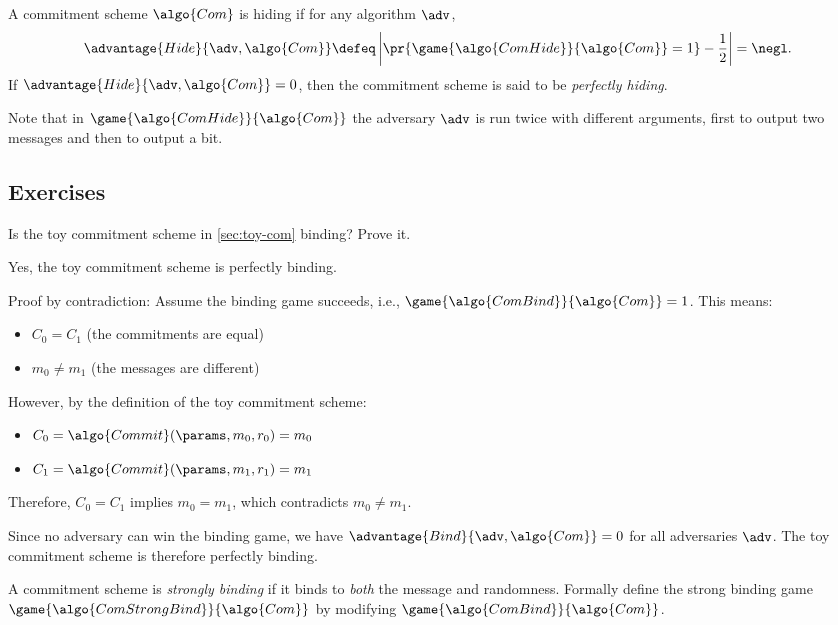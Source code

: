 \begin{definition}[Hiding]
  A commitment scheme $\algo{Com}$ is hiding if for any \ppt algorithm $\adv$,
 \[
  \advantage{Hide}{\adv, \algo{Com}} \defeq \left|\pr{\game{\algo{ComHide}}{\algo{Com}} = 1} - \frac{1}{2}\right| = \negl.
 \]
 If $\advantage{Hide}{\adv, \algo{Com}} = 0$, then the commitment scheme is said to be \emph{perfectly hiding}.
\end{definition}

Note that in $\game{\algo{ComHide}}{\algo{Com}}$ the adversary $\adv$ is run twice with different arguments, first to output two messages and then to output a bit.

\subsection{Exercises}

\begin{exercise}
  Is the toy commitment scheme in \cref{sec:toy-com} binding?
  Prove it.
\end{exercise}

\ifsolutions
\begin{mysolution}
  Yes, the toy commitment scheme is perfectly binding.
  
  Proof by contradiction: Assume the binding game succeeds, i.e., $\game{\algo{ComBind}}{\algo{Com}} = 1$.
  This means:
  \begin{itemize}
    \item $C_0 = C_1$ (the commitments are equal)
    \item $m_0 \neq m_1$ (the messages are different)
  \end{itemize}
  
  However, by the definition of the toy commitment scheme:
  \begin{itemize}
    \item $C_0 = \algo{Commit}(\params, m_0, r_0) = m_0$
    \item $C_1 = \algo{Commit}(\params, m_1, r_1) = m_1$
  \end{itemize}
  
  Therefore, $C_0 = C_1$ implies $m_0 = m_1$, which contradicts $m_0 \neq m_1$.
  
  Since no adversary can win the binding game, we have $\advantage{Bind}{\adv, \algo{Com}} = 0$ for all adversaries $\adv$.
  The toy commitment scheme is therefore perfectly binding.
\end{mysolution}
\fi

\begin{exercise}
  A commitment scheme is \emph{strongly binding} if it binds to \emph{both} the message and randomness.
  Formally define the strong binding game $\game{\algo{ComStrongBind}}{\algo{Com}}$ by modifying $\game{\algo{ComBind}}{\algo{Com}}$.
\end{exercise}

